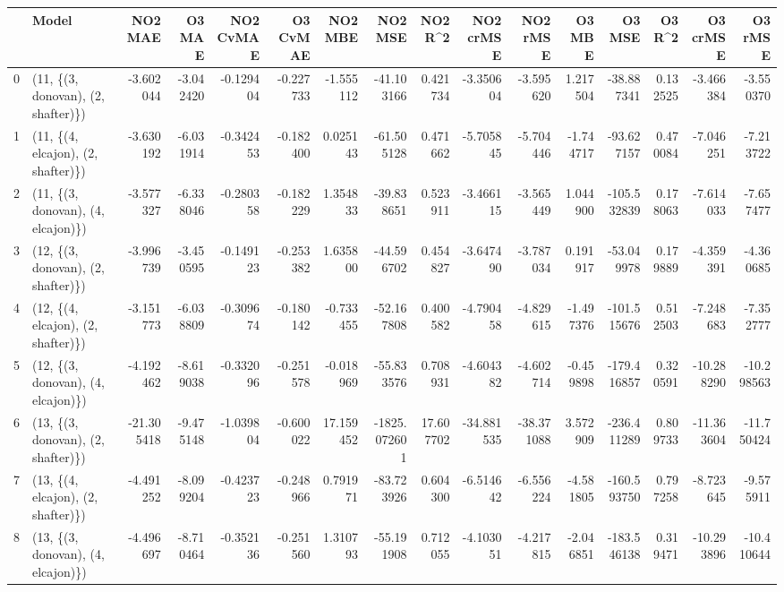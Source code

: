 \begin{tabular}{llrrrrrrrrrrrrrr}
\toprule
{} &                               Model &    NO2 MAE &     O3 MAE &  NO2 CvMAE &  O3 CvMAE &    NO2 MBE &      NO2 MSE &    NO2 R\textasciicircum2 &  NO2 crMSE &   NO2 rMSE &     O3 MBE &      O3 MSE &    O3 R\textasciicircum2 &   O3 crMSE &    O3 rMSE \\
\midrule
0  &  (11, \{(3, donovan), (2, shafter)\}) &  -3.602044 &  -3.042420 &  -0.129404 & -0.227733 &  -1.555112 &   -41.103166 &   0.421734 &  -3.350604 &  -3.595620 &   1.217504 &  -38.887341 &  0.132525 &  -3.466384 &  -3.550370 \\
1  &  (11, \{(4, elcajon), (2, shafter)\}) &  -3.630192 &  -6.031914 &  -0.342453 & -0.182400 &   0.025143 &   -61.505128 &   0.471662 &  -5.705845 &  -5.704446 &  -1.744717 &  -93.627157 &  0.470084 &  -7.046251 &  -7.213722 \\
2  &  (11, \{(3, donovan), (4, elcajon)\}) &  -3.577327 &  -6.338046 &  -0.280358 & -0.182229 &   1.354833 &   -39.838651 &   0.523911 &  -3.466115 &  -3.565449 &   1.044900 & -105.532839 &  0.178063 &  -7.614033 &  -7.657477 \\
3  &  (12, \{(3, donovan), (2, shafter)\}) &  -3.996739 &  -3.450595 &  -0.149123 & -0.253382 &   1.635800 &   -44.596702 &   0.454827 &  -3.647490 &  -3.787034 &   0.191917 &  -53.049978 &  0.179889 &  -4.359391 &  -4.360685 \\
4  &  (12, \{(4, elcajon), (2, shafter)\}) &  -3.151773 &  -6.038809 &  -0.309674 & -0.180142 &  -0.733455 &   -52.167808 &   0.400582 &  -4.790458 &  -4.829615 &  -1.497376 & -101.515676 &  0.512503 &  -7.248683 &  -7.352777 \\
5  &  (12, \{(3, donovan), (4, elcajon)\}) &  -4.192462 &  -8.619038 &  -0.332096 & -0.251578 &  -0.018969 &   -55.833576 &   0.708931 &  -4.604382 &  -4.602714 &  -0.459898 & -179.416857 &  0.320591 & -10.288290 & -10.298563 \\
6  &  (13, \{(3, donovan), (2, shafter)\}) & -21.305418 &  -9.475148 &  -1.039804 & -0.600022 &  17.159452 & -1825.072601 &  17.607702 & -34.881535 & -38.371088 &   3.572909 & -236.411289 &  0.809733 & -11.363604 & -11.750424 \\
7  &  (13, \{(4, elcajon), (2, shafter)\}) &  -4.491252 &  -8.099204 &  -0.423723 & -0.248966 &   0.791971 &   -83.723926 &   0.604300 &  -6.514642 &  -6.556224 &  -4.581805 & -160.593750 &  0.797258 &  -8.723645 &  -9.575911 \\
8  &  (13, \{(3, donovan), (4, elcajon)\}) &  -4.496697 &  -8.710464 &  -0.352136 & -0.251560 &   1.310793 &   -55.191908 &   0.712055 &  -4.103051 &  -4.217815 &  -2.046851 & -183.546138 &  0.319471 & -10.293896 & -10.410644 \\

\end{tabular}

